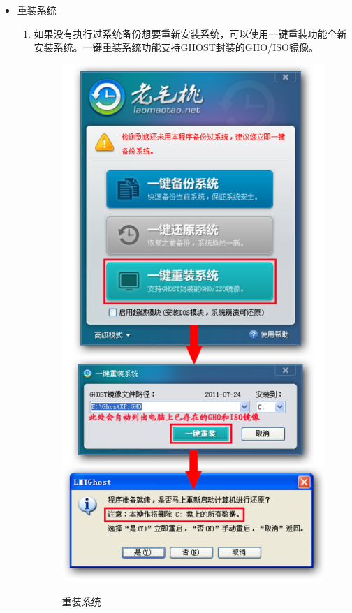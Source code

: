 \begin{itemize}
\item 重装系统\\
\begin{enumerate}
\item 如果没有执行过系统备份想要重新安装系统，可以使用一键重装功能全新安装系统。一键重装系统功能支持GHOST封装的GHO/ISO镜像。\\
\begin{figure}[!htbp]
	\centering
	\caption{重装系统}  
		\includegraphics[scale=0.35]{figs/win_lmt_reinstall_startup.pdf}
    	\label{fig:win_lmt_backup_result}
\end{figure}
\end{enumerate}

\end{itemize}
\clearpage
